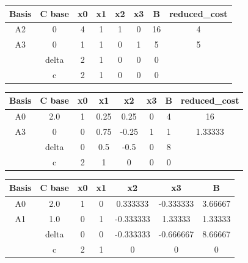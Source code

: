 \documentclass[17pt]{extarticle}
\begin{document}
\begin{table}[H]
    \centering
    \begin{tabular}{c|c|cccc|c|c}
        \toprule
        Basis & C base & x0 & x1 & x2 & x3 & B  & reduced\_cost \\
        \midrule
        A2    & 0      & 4  & 1  & 1  & 0  & 16 & 4             \\
        A3    & 0      & 1  & 1  & 0  & 1  & 5  & 5             \\
        \midrule
              & delta  & 2  & 1  & 0  & 0  & 0  &               \\
              & c      & 2  & 1  & 0  & 0  & 0  &               \\
        \bottomrule
    \end{tabular}
\end{table}

\begin{table}[H]
    \centering
    \begin{tabular}{c|c|cccc|c|c}
        \toprule
        Basis & C base & x0 & x1   & x2    & x3 & B & reduced\_cost \\
        \midrule
        A0    & 2.0    & 1  & 0.25 & 0.25  & 0  & 4 & 16            \\
        A3    & 0      & 0  & 0.75 & -0.25 & 1  & 1 & 1.33333       \\
        \midrule
              & delta  & 0  & 0.5  & -0.5  & 0  & 8 &               \\
              & c      & 2  & 1    & 0     & 0  & 0 &               \\
        \bottomrule
    \end{tabular}
\end{table}

\begin{table}[H]
    \centering
    \begin{tabular}{c|c|cccc|c}
        \toprule
        Basis & C base & x0 & x1 & x2        & x3        & B       \\
        \midrule
        A0    & 2.0    & 1  & 0  & 0.333333  & -0.333333 & 3.66667 \\
        A1    & 1.0    & 0  & 1  & -0.333333 & 1.33333   & 1.33333 \\
        \midrule
              & delta  & 0  & 0  & -0.333333 & -0.666667 & 8.66667 \\
              & c      & 2  & 1  & 0         & 0         & 0       \\
        \bottomrule
    \end{tabular}
\end{table}
\end{document}
